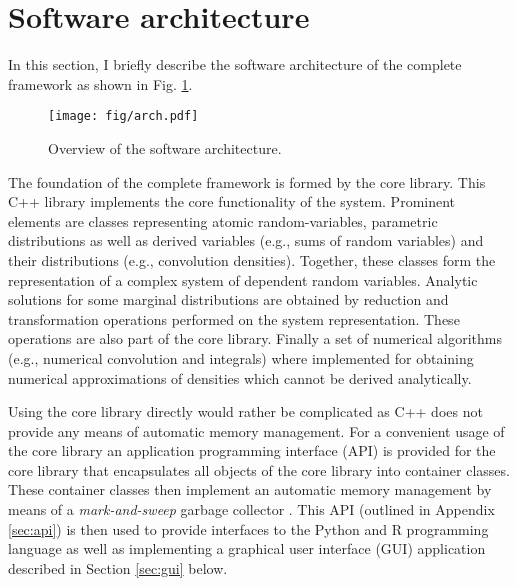 \section{Software architecture}\label{sec:arch}
In this section, I briefly describe the software architecture of the complete 
framework as shown in Fig. \ref{fig:arch}. 

\begin{figure} [!ht]
 \centering
 \texttt{[image: fig/arch.pdf]}
 \caption{Overview of the  software architecture.} \label{fig:arch}
\end{figure}

The foundation of the complete framework is formed by the  core library. This C++
library implements the core functionality of the system. Prominent elements are classes
representing atomic random-variables, parametric distributions as well as derived
variables (e.g., sums of random variables) and their distributions (e.g., convolution densities).  
Together, these classes form the representation of a complex system of dependent random variables.
Analytic solutions for some marginal distributions are obtained by reduction and transformation
operations performed on the system representation. These operations are also part of the core
library. Finally a set of numerical algorithms (e.g., numerical convolution and integrals) where
implemented for obtaining numerical approximations of densities which cannot
be derived analytically. 

Using the core library directly would rather be complicated as C++ does not provide any means of automatic
memory management. For a convenient usage of the core library an application programming interface
(API) is provided for the core library that encapsulates all objects of the core library into
container classes. These container classes then implement an automatic memory management by
means of a \emph{mark-and-sweep} garbage collector \cite[e.g.,][]{Aho2007}. This API (outlined
in Appendix \ref{sec:api}) is then used to provide interfaces to the Python and R programming
language as well as implementing a graphical user interface (GUI) application described in Section 
\ref{sec:gui} below.